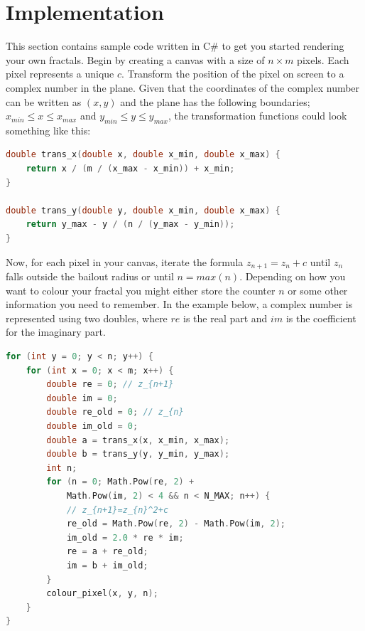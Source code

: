 \documentclass{article}
\begin{document}
\section{Implementation}
This section contains sample code written in C\# to get you started rendering your own fractals.
Begin by creating a canvas with a size of $n\times m$ pixels. Each pixel represents a unique $c$. Transform the position of the pixel on screen to a complex number in the plane. Given that the coordinates of the complex number can be written as $(x, y)$ and the plane has the following boundaries; $x_{min}\le x \le x_{max}$ and $y_{min} \le y \le y_{max}$, the transformation functions could look something like this:
\begin{lstlisting}[language=C]
double trans_x(double x, double x_min, double x_max) {
    return x / (m / (x_max - x_min)) + x_min;
}

double trans_y(double y, double x_min, double x_max) {
    return y_max - y / (n / (y_max - y_min));
}
\end{lstlisting}
Now, for each pixel in your canvas, iterate the formula $z_{n+1}=z_{n}+c$ until $z_{n}$ falls outside the bailout radius or until $n=max(n)$. Depending on how you want to colour your fractal you might either store the counter $n$ or some other information you need to remember. In the example below, a complex number is represented using two doubles, where $re$ is the real part and $im$ is the coefficient for the imaginary part.
\begin{lstlisting}[language=C]
for (int y = 0; y < n; y++) {
    for (int x = 0; x < m; x++) {
        double re = 0; // z_{n+1} 
        double im = 0;
        double re_old = 0; // z_{n}
        double im_old = 0;
        double a = trans_x(x, x_min, x_max);
        double b = trans_y(y, y_min, y_max);
        int n;
        for (n = 0; Math.Pow(re, 2) + 
            Math.Pow(im, 2) < 4 && n < N_MAX; n++) {
            // z_{n+1}=z_{n}^2+c
            re_old = Math.Pow(re, 2) - Math.Pow(im, 2);
            im_old = 2.0 * re * im;
            re = a + re_old;
            im = b + im_old;
        }
        colour_pixel(x, y, n);
    }
}
\end{lstlisting}
\end{document}
